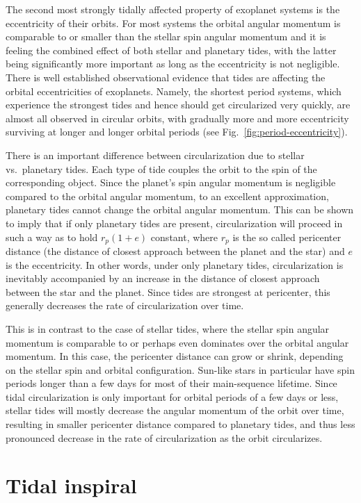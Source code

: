 The second most strongly tidally affected property of exoplanet systems is the
eccentricity of their orbits. For most systems the orbital angular momentum is
comparable to or smaller than the stellar spin angular momentum and it is
feeling the combined effect of both stellar and planetary tides, with the latter
being significantly more important as long as the eccentricity is not
negligible. There is well established observational evidence that tides are
affecting the orbital eccentricities of exoplanets. Namely, the shortest period
systems, which experience the strongest tides and hence should get circularized
very quickly, are almost all observed in circular orbits, with gradually more
and more eccentricity surviving at longer and longer orbital periods (see
Fig.~\ref{fig:period-eccentricity}).

There is an important difference between circularization due to stellar vs.\
planetary tides. Each type of tide couples the orbit to the spin of the
corresponding object. Since the planet's spin angular momentum is negligible
compared to the orbital angular momentum, to an excellent approximation,
planetary tides cannot change the orbital angular momentum. This can be shown to
imply that if only planetary tides are present, circularization will proceed in
such a way as to hold $r_p(1+e)$ constant, where $r_p$ is the so called
pericenter distance (the distance of closest approach between the planet and the
star) and $e$ is the eccentricity. In other words, under only planetary tides,
circularization is inevitably accompanied by an increase in the distance of
closest approach between the star and the planet. Since tides are strongest at
pericenter, this generally decreases the rate of circularization over time.

This is in contrast to the case of stellar tides, where the stellar spin angular
momentum is comparable to or perhaps even dominates over the orbital angular
momentum. In this case, the pericenter distance can grow or shrink, depending on
the stellar spin and orbital configuration. Sun-like stars in particular have
spin periods longer than a few days for most of their main-sequence lifetime.
Since tidal circularization is only important for orbital periods of a few days
or less, stellar tides will mostly decrease the angular momentum of the orbit
over time, resulting in smaller pericenter distance compared to planetary
tides, and thus less pronounced decrease in the rate of circularization as the
orbit circularizes.

\section{Tidal inspiral}


